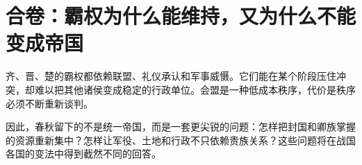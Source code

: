 \section{合卷：霸权为什么能维持，又为什么不能变成帝国}

齐、晋、楚的霸权都依赖联盟、礼仪承认和军事威慑。它们能在某个阶段压住冲突，却难以把其他诸侯变成稳定的行政单位。会盟是一种低成本秩序，代价是秩序必须不断重新谈判。

因此，春秋留下的不是统一帝国，而是一套更尖锐的问题：怎样把封国和卿族掌握的资源重新集中？怎样让军役、土地和行政不只依赖贵族关系？这些问题将在战国各国的变法中得到截然不同的回答。

